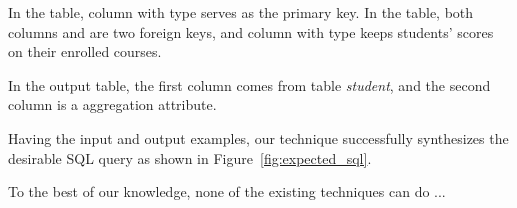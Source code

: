 In the  table, column {} with
 type serves as the primary key. 
In the  table, both columns {} and
{} are two foreign keys, and column {}
with  type keeps students' scores on their enrolled courses.

In the output table, the first column  {}
comes from table \textit{student}, and the second column {}
is a aggregation attribute.%

Having the input and output examples, our technique successfully synthesizes
the desirable SQL query as shown in Figure~\ref{fig:expected_sql}.

To the best of our knowledge, none of the
existing techniques can do ...
